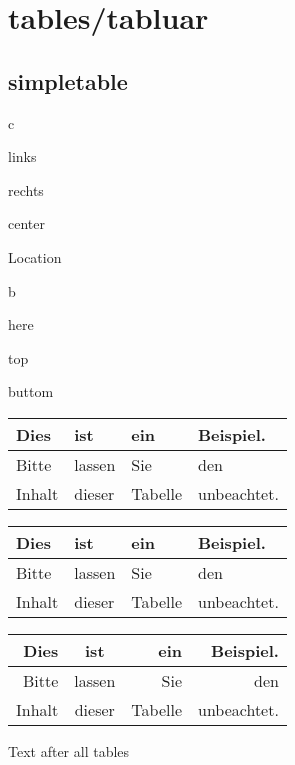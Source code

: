 \chapter{tables/tabluar}
\section{simpletable}

\begin{labeling}[ --]{c}
	\item[l] links
	\item[r] rechts
	\item[c] center
\end{labeling}

Location

\begin{labeling}[ --]{b}
	\item[h] here
	\item[t] top
	\item[b] buttom
\end{labeling}


\begin{table}[h]
	\begin{tabular}{l|lll}
		Dies & ist & ein & Beispiel.\\
		\hline
		Bitte & lassen & Sie & den \\
		Inhalt & dieser & Tabelle & unbeachtet.
	\end{tabular}
\end{table}

\begin{table}[t]
	\begin{tabular}{l|lll}
		Dies & ist & ein & Beispiel.\\
		\hline
		Bitte & lassen & Sie & den \\
		Inhalt & dieser & Tabelle & unbeachtet.
	\end{tabular}
\end{table}

\begin{table}[b]
	\begin{tabular}{rcrr}
		Dies & ist & ein & Beispiel.\\
		\hline
		Bitte & lassen & Sie & den \\
		Inhalt & dieser & Tabelle & unbeachtet.
	\end{tabular}
\end{table}

Text after all tables
